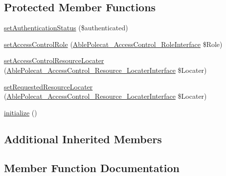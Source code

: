 \subsection*{Protected Member Functions}
\begin{DoxyCompactItemize}
\item 
\hyperlink{class_able_polecat___transaction___authenticate_abstract_a47b35a22949abe6f491376af395db717}{set\+Authentication\+Status} (\$authenticated)
\item 
\hyperlink{class_able_polecat___transaction___authenticate_abstract_a7d300204cfff0687661c972cc97f9a89}{set\+Access\+Control\+Role} (\hyperlink{interface_able_polecat___access_control___role_interface}{Able\+Polecat\+\_\+\+Access\+Control\+\_\+\+Role\+Interface} \$Role)
\item 
\hyperlink{class_able_polecat___transaction___authenticate_abstract_abb43969d30089b780bd0de857d1b82a5}{set\+Access\+Control\+Resource\+Locater} (\hyperlink{interface_able_polecat___access_control___resource___locater_interface}{Able\+Polecat\+\_\+\+Access\+Control\+\_\+\+Resource\+\_\+\+Locater\+Interface} \$Locater)
\item 
\hyperlink{class_able_polecat___transaction___authenticate_abstract_a721533e5f94a976a2b7bf3588156f2af}{set\+Requested\+Resource\+Locater} (\hyperlink{interface_able_polecat___access_control___resource___locater_interface}{Able\+Polecat\+\_\+\+Access\+Control\+\_\+\+Resource\+\_\+\+Locater\+Interface} \$Locater)
\item 
\hyperlink{class_able_polecat___transaction___authenticate_abstract_a91098fa7d1917ce4833f284bbef12627}{initialize} ()
\end{DoxyCompactItemize}
\subsection*{Additional Inherited Members}


\subsection{Member Function Documentation}
\hypertarget{class_able_polecat___transaction___authenticate_abstract_a750c93a7dfab5314f2bf662a407bc5a6}{}
